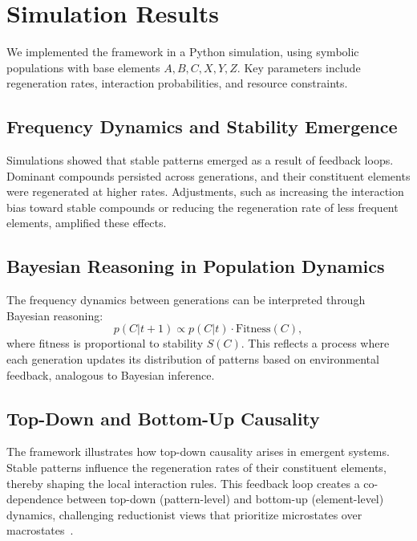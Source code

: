 \documentclass[entropy,article,submit,pdftex,moreauthors]{Definitions/mdpi}
\begin{document}
\section{Simulation Results}

We implemented the framework in a Python simulation, using symbolic populations with base elements \( A, B, C, X, Y, Z \). Key parameters include regeneration rates, interaction probabilities, and resource constraints. 

\subsection{Frequency Dynamics and Stability Emergence}

Simulations showed that stable patterns emerged as a result of feedback loops. Dominant compounds persisted across generations, and their constituent elements were regenerated at higher rates. Adjustments, such as increasing the interaction bias toward stable compounds or reducing the regeneration rate of less frequent elements, amplified these effects.

\subsection{Bayesian Reasoning in Population Dynamics}

The frequency dynamics between generations can be interpreted through Bayesian reasoning:
\begin{equation}
p(C|t+1) \propto p(C|t) \cdot \text{Fitness}(C),
\end{equation}
where fitness is proportional to stability \( S(C) \). This reflects a process where each generation updates its distribution of patterns based on environmental feedback, analogous to Bayesian inference.

\subsection{Top-Down and Bottom-Up Causality}

The framework illustrates how top-down causality arises in emergent systems. Stable patterns influence the regeneration rates of their constituent elements, thereby shaping the local interaction rules. This feedback loop creates a co-dependence between top-down (pattern-level) and bottom-up (element-level) dynamics, challenging reductionist views that prioritize microstates over macrostates~\cite{laughlin2000different}.
\end{document}
